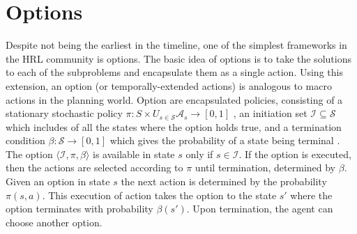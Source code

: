 \section{Options}

Despite not being the earliest in the timeline, one of the simplest frameworks in the HRL community is options. The basic idea of options is to take the solutions to each of the subproblems and encapsulate them as a single action. Using this extension, an option (or temporally-extended actions) is analogous to macro actions in the planning world. Option are encapsulated policies, consisting of a stationary stochastic policy \(\pi:S \times U_{s \in \mathcal{S}}  \mathcal{A}_s \rightarrow [0,1]\) , an initiation set \(\mathcal{I} \subseteq  \mathcal{S}\) which includes of all the states where the option holds true, and a termination condition \(\beta:\mathcal{S} \rightarrow [0,1]\) which gives the probability of a state being terminal \cite{Sutton}. The option \( \langle \mathcal{I},\pi,\beta \rangle \) is available in state \(s\) only if \(s \in \mathcal{I} \). If the option is executed, then the actions are selected according to \(\pi\) until termination, determined by \(\beta\). Given an option in state \(s\) the next action is determined by the probability \(\pi(s,a)\). This execution of action takes the option to the state \(s'\) where the option terminates with probability \(\beta(s')\). Upon termination, the agent can choose another option.

\iffalse
Consider a humanoid robot which has the task of opening the door to exit a room. This problem can further have subproblems like reaching, grasping and turning the knob. The initiation set considers of all the states where the agent is inside the room. Actions include navigating within the room, grasping the door knob and turning it to leave the room. The policies determine the ways to navigate through this small world. On exiting the room, \(\beta(s)=1\), which is the only terminal state for this example. This option can further be a part of any larger problem. In other words, options can act as actions within another option. These chain of options gives the hierarchy. Thus, in HRL a set of options replaces the set of actions. \\
\fi

